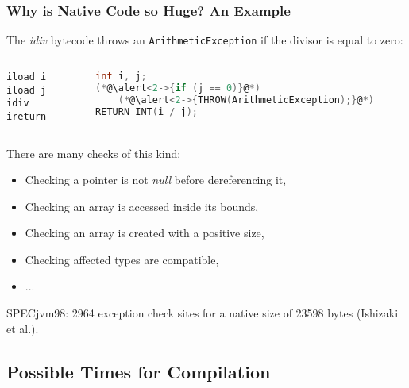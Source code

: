 \documentclass{beamer}
\begin{document}
\begin{frame}[fragile]
\frametitle{Why is Native Code so Huge? An Example}

The \emph{idiv} bytecode throws an \texttt{ArithmeticException} if the divisor is equal to zero:

\begin{columns}
\begin{column}{5.1cm}
\begin{lstlisting}[language=jvmis]
iload i
iload j
idiv
ireturn
\end{lstlisting}
\end{column}
\begin{column}{5.1cm}
\begin{lstlisting}[language=C]
int i, j;
(*@\alert<2->{if (j == 0)}@*)
	(*@\alert<2->{THROW(ArithmeticException);}@*)
RETURN_INT(i / j);
\end{lstlisting}
\end{column}
\end{columns}
\bigskip
There are many checks of this kind:
\begin{itemize}
\item Checking a pointer is not \emph{null} before dereferencing it,
\item Checking an array is accessed inside its bounds,
\item Checking an array is created with a positive size,
\item Checking affected types are compatible,
\item ...
\end{itemize}
SPECjvm98: 2964 exception check sites for a native size of 23598 bytes (Ishizaki et al.).
\end{frame}

\subsection{Possible Times for Compilation}
\end{document}
